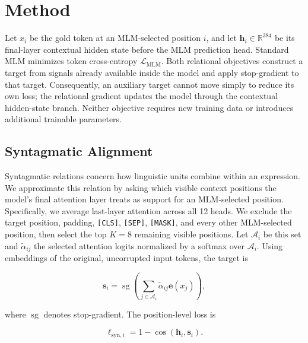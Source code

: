 \documentclass[11pt,a4paper]{article}
\begin{document}
\section{Method}
\label{sec:method}

Let $x_i$ be the gold token at an MLM-selected position $i$, and let
$\mathbf{h}_i\in\mathbb{R}^{384}$ be its final-layer contextual hidden
state before the MLM prediction head. Standard MLM minimizes token
cross-entropy $\mathcal{L}_{\mathrm{MLM}}$. Both relational objectives
construct a target from signals already available inside the model and
apply stop-gradient to that target. Consequently, an auxiliary target
cannot move simply to reduce its own loss; the relational gradient
updates the model through the contextual hidden-state branch. Neither
objective requires new training data or introduces additional
trainable parameters.

\subsection{Syntagmatic Alignment}
\label{sec:syntagmatic}

Syntagmatic relations concern how linguistic units combine within an
expression. We approximate this relation by asking which visible
context positions the model's final attention layer treats as support
for an MLM-selected position. Specifically, we average last-layer
attention across all 12 heads. We exclude the target position, padding,
\texttt{[CLS]}, \texttt{[SEP]}, \texttt{[MASK]}, and every other
MLM-selected position, then select the top $K=8$ remaining visible
positions. Let $\mathcal{A}_i$ be this set and
$\widetilde{\alpha}_{ij}$ the selected attention logits normalized by
a softmax over $\mathcal{A}_i$. Using embeddings of the original,
uncorrupted input tokens, the target is

\begin{equation}
\mathbf{s}_i =
\operatorname{sg}\!\left(
\sum_{j\in\mathcal{A}_i}
\widetilde{\alpha}_{ij}\mathbf{e}(x_j)
\right),
\label{eq:syntagmatic_target}
\end{equation}

where $\operatorname{sg}$ denotes stop-gradient. The position-level
loss is

\begin{equation}
\ell_{\mathrm{syn},i}=1-\cos(\mathbf{h}_i,\mathbf{s}_i).
\label{eq:syntagmatic_alignment}
\end{equation}
\end{document}
